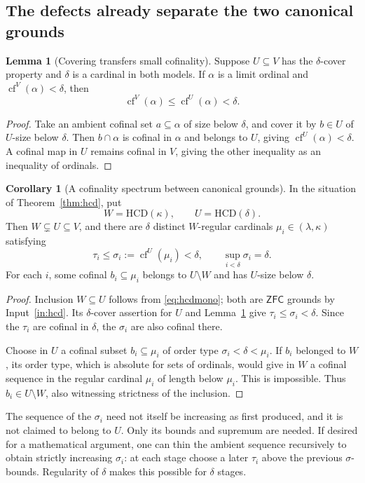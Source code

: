 \documentclass[11pt,letterpaper]{article}
\theoremstyle{definition}
\newtheorem{lemma}[definition]{Lemma}
\newtheorem{corollary}[definition]{Corollary}
\numberwithin{equation}{section}
\newcommand{\ZFC}{\mathsf{ZFC}}
\newcommand{\HCD}{\mathrm{HCD}}
\newcommand{\cf}{\operatorname{cf}}
\begin{document}
\subsection{The defects already separate the two canonical grounds}

\begin{lemma}[Covering transfers small cofinality]\label{lem:covercof}
Suppose $U\subseteq V$ has the $\delta$-cover property and $\delta$ is a cardinal in both models. If $\alpha$ is a limit ordinal and $\cf^V(\alpha)<\delta$, then
\[
\cf^V(\alpha)\le\cf^U(\alpha)<\delta.
\]
\end{lemma}
\begin{proof}
Take an ambient cofinal set $a\subseteq\alpha$ of size below $\delta$, and cover it by $b\in U$ of $U$-size below $\delta$. Then $b\cap\alpha$ is cofinal in $\alpha$ and belongs to $U$, giving $\cf^U(\alpha)<\delta$. A cofinal map in $U$ remains cofinal in $V$, giving the other inequality as an inequality of ordinals.
\end{proof}

\begin{corollary}[A cofinality spectrum between canonical grounds]\label{cor:twogrounds}
In the situation of Theorem~\ref{thm:hcd}, put
\[
W=\HCD(\kappa),\qquad U=\HCD(\delta).
\]
Then $W\subsetneq U\subseteq V$, and there are $\delta$ distinct $W$-regular cardinals $\mu_i\in(\lambda,\kappa)$ satisfying
\[
\tau_i\le\sigma_i:=\cf^U(\mu_i)<\delta,
\qquad\sup_{i<\delta}\sigma_i=\delta.
\]
For each $i$, some cofinal $b_i\subseteq\mu_i$ belongs to $U\setminus W$ and has $U$-size below $\delta$.
\end{corollary}
\begin{proof}
Inclusion $W\subseteq U$ follows from \eqref{eq:hcdmono}; both are $\ZFC$ grounds by Input~\ref{in:hcd}. Its $\delta$-cover assertion for $U$ and Lemma~\ref{lem:covercof} give $\tau_i\le\sigma_i<\delta$. Since the $\tau_i$ are cofinal in $\delta$, the $\sigma_i$ are also cofinal there.

Choose in $U$ a cofinal subset $b_i\subseteq\mu_i$ of order type $\sigma_i<\delta<\mu_i$. If $b_i$ belonged to $W$, its order type, which is absolute for sets of ordinals, would give in $W$ a cofinal sequence in the regular cardinal $\mu_i$ of length below $\mu_i$. This is impossible. Thus $b_i\in U\setminus W$, also witnessing strictness of the inclusion.
\end{proof}

The sequence of the $\sigma_i$ need not itself be increasing as first produced, and it is not claimed to belong to $U$. Only its bounds and supremum are needed. If desired for a mathematical argument, one can thin the ambient sequence recursively to obtain strictly increasing $\sigma_i$: at each stage choose a later $\tau_i$ above the previous $\sigma$-bounds. Regularity of $\delta$ makes this possible for $\delta$ stages.
\end{document}
